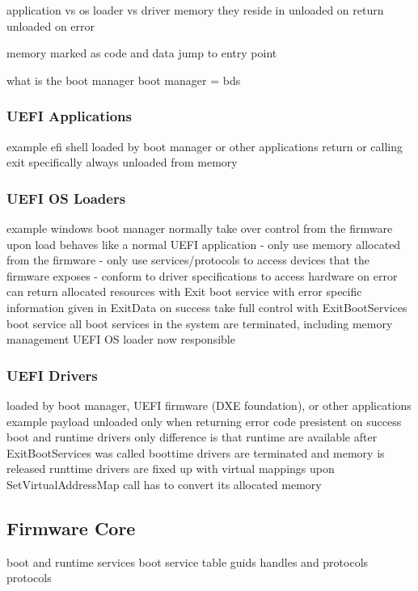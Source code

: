 application vs os loader vs driver
memory they reside in
unloaded on return
unloaded on error

memory marked as code and data
jump to entry point

what is the boot manager
boot manager = bds

\subsubsection{\acs{UEFI} Applications}

example efi shell
loaded by boot manager or other applications
return or calling exit specifically
always unloaded from memory

\subsubsection{UEFI OS Loaders}

example windows boot manager
normally take over control from the firmware
upon load behaves like a normal UEFI application
- only use memory allocated from the firmware
- only use services/protocols to access devices that the firmware exposes
- conform to driver specifications to access hardware
on error can return allocated resources with Exit boot service with error specific information given in ExitData
on success take full control with ExitBootServices boot service
all boot services in the system are terminated, including memory management
UEFI OS loader now responsible

\subsubsection{UEFI Drivers}

loaded by boot manager, UEFI firmware (DXE foundation), or other applications
example payload
unloaded only when returning error code
presistent on success
boot and runtime drivers
only difference is that runtime are available after ExitBootServices was called
boottime drivers are terminated and memory is released
runttime drivers are fixed up with virtual mappings upon SetVirtualAddressMap call
has to convert its allocated memory

\subsection{Firmware Core}

boot and runtime services
boot service table
guids
handles and protocols
protocols

